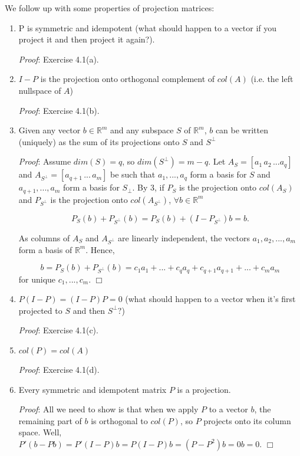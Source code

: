 \documentclass[12pt,oneside]{article}
\begin{document}
 We follow up with some
properties of projection matrices:

\begin{enumerate}
\item P is symmetric and idempotent (what should happen to a vector if
  you project it and then project it again?).

\emph{Proof}: Exercise 4.1(a).

\item $I - P$ is the projection onto orthogonal complement of $col(A)$
  (i.e. the left nullspace of $A$)

\emph{Proof}: Exercise 4.1(b).

\item Given any vector $b \in {\mathbb{R}}^m$ and any subspace $S$ of
  ${\mathbb{R}}^m$, $b$ can be written (uniquely) as the sum of its
  projections onto $S$ and $S^\perp$

\emph{Proof}: Assume $dim(S) = q$, so $dim(S^\perp) = m-q$.  Let $A_S = [a_1 \, a_2 \, ... a_q]$ and $A_{S^\perp} = [a_{q+1} \, ... \, a_m]$ be such that $a_1,...,a_q$ form a basis for $S$ and $a_{q+1}, ..., a_m$ form a basis for $S_\perp$.  By 3, if $P_S$ is the projection onto $col(A_S)$ and $P_{S^\perp}$ is the projection onto $col(A_{S^\perp})$, $\forall b \in  {\mathbb{R}}^m$

\[P_S (b) + P_{S^\perp} (b) = P_S (b) + (I - P_{S^\perp})b = b. \]

As columns of $A_S$ and $A_{S^\perp}$ are linearly independent, the vectors $a_1,a_2,...,a_m$ form a basis of $\mathbb{R}^m$.  Hence,

\[b = P_S(b) + P_{S^\perp}(b) = c_1a_1+...+c_qa_q+c_{q+1}a_{q+1}+...+c_ma_m \]
for unique $c_1,...,c_m$. $\Box$

\item $P(I-P) = (I-P)P = 0$ (what should happen to a vector when it's
  first projected to $S$ and then $S^ \perp?$)

\emph{Proof}: Exercise 4.1(c).

\item $col(P) = col(A)$

\emph{Proof}: Exercise 4.1(d).

\item Every symmetric and idempotent matrix $P$ is a projection.

\emph{Proof}: All we need to show is that when we apply $P$ to a vector $b$, the
  remaining part of $b$ is orthogonal to $col(P)$, so $P$ projects
  onto its column space. Well, $P'(b-Pb) = P'(I - P)b = P(I-P)b = (P -
  P^2)b = 0b = 0$. $\Box$


\end{enumerate}
\end{document}
